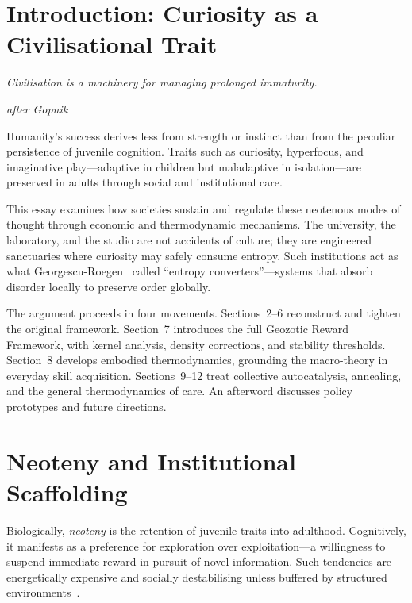 \documentclass[12pt,a4paper]{article}
\theoremstyle{definition}
\begin{document}
\tableofcontents
\newpage

\section{Introduction: Curiosity as a Civilisational Trait}

\epigraph{\itshape Civilisation is a machinery for managing prolonged
immaturity.}{\textit{after Gopnik}}

Humanity's success derives less from strength or instinct than from the peculiar
persistence of juvenile cognition.  Traits such as curiosity, hyperfocus, and
imaginative play---adaptive in children but maladaptive in isolation---are
preserved in adults through social and institutional care.

This essay examines how societies sustain and regulate these neotenous modes of
thought through economic and thermodynamic mechanisms.  The university, the
laboratory, and the studio are not accidents of culture; they are engineered
sanctuaries where curiosity may safely consume entropy.  Such institutions act
as what Georgescu-Roegen~\citeyearpar{georgesuroegen1971} called ``entropy
converters''---systems that absorb disorder locally to preserve order globally.

The argument proceeds in four movements.  Sections~2--6 reconstruct and
tighten the original framework.  Section~7 introduces the full Geozotic Reward
Framework, with kernel analysis, density corrections, and stability thresholds.
Section~8 develops embodied thermodynamics, grounding the macro-theory in
everyday skill acquisition.  Sections~9--12 treat collective autocatalysis,
annealing, and the general thermodynamics of care.  An afterword discusses
policy prototypes and future directions.

\section{Neoteny and Institutional Scaffolding}

Biologically, \emph{neoteny} is the retention of juvenile traits into
adulthood.  Cognitively, it manifests as a preference for exploration over
exploitation---a willingness to suspend immediate reward in pursuit of novel
information.  Such tendencies are energetically expensive and socially
destabilising unless buffered by structured environments~\citep{gopnik2025}.
\end{document}
